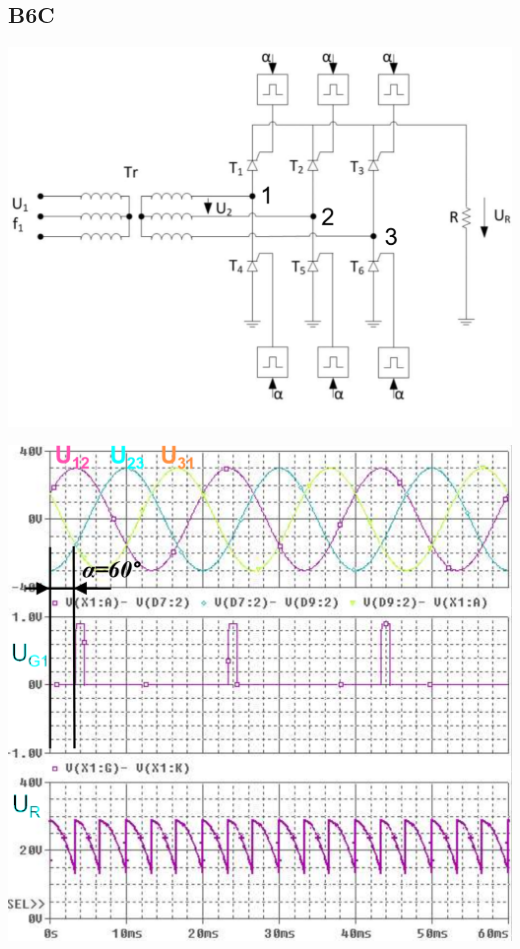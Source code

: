 \subsection{B6C}
\begin{minipage}{0.4\linewidth}
    \includegraphics[width=0.8\linewidth]{images/GRB6c}
\end{minipage}
\begin{minipage}{0.35\linewidth}
    \centering 
    \includegraphics[width=0.8\linewidth]{images/B6CKl}
    
\end{minipage}
\begin{minipage}{0.25\linewidth}
\end{minipage}
\newline

\clearpage